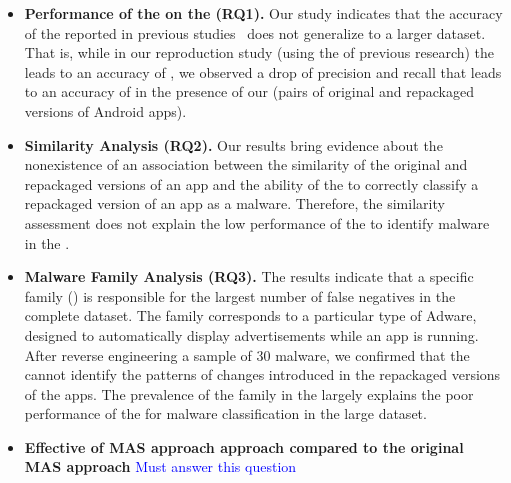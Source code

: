 \begin{itemize}
\item \textbf{Performance of the \mas on the \cds (RQ1).} 
  Our study indicates that the accuracy of the \mas reported in
  previous studies~\cite{DBLP:conf/wcre/BaoLL18,DBLP:journals/jss/CostaMMSSBNR22} does not
  generalize to a larger dataset. That is, while in our
  reproduction study (using the \sds of previous research) the \mas
  leads to an accuracy of \fscoreSmall, we observed a drop of precision and recall
  that leads to an accuracy of \fscore in the presence of our \cds (\apps pairs of
  original and repackaged versions of Android apps). 


\item \textbf{Similarity Analysis (RQ2).} Our results bring evidence about the nonexistence of an 
  association between the similarity of the original and repackaged versions of an app
  and the ability of the \mas to correctly
  classify a repackaged version of an app as a malware. Therefore,
  the similarity assessment does not explain the low
  performance of the \mas to identify malware in the \cds.

\item \textbf{Malware Family Analysis (RQ3).} The results indicate that a specific family
  (\gps)  is responsible for the largest number of false
  negatives in the complete dataset. The \gps family corresponds to a particular type of
  Adware, designed to automatically display advertisements while an app is running. After reverse engineering
  a sample of 30 \gps malware, we confirmed that the \mas cannot identify the
  patterns of changes introduced in the repackaged versions of the apps. The prevalence of the \gps family
  in the \cds largely explains the poor performance of the \mas for malware classification in the large dataset. 

\item \textbf{Effective of MAS approach approach compared to the original MAS approach}
\textcolor{blue}{Must answer this question}

\end{itemize}





